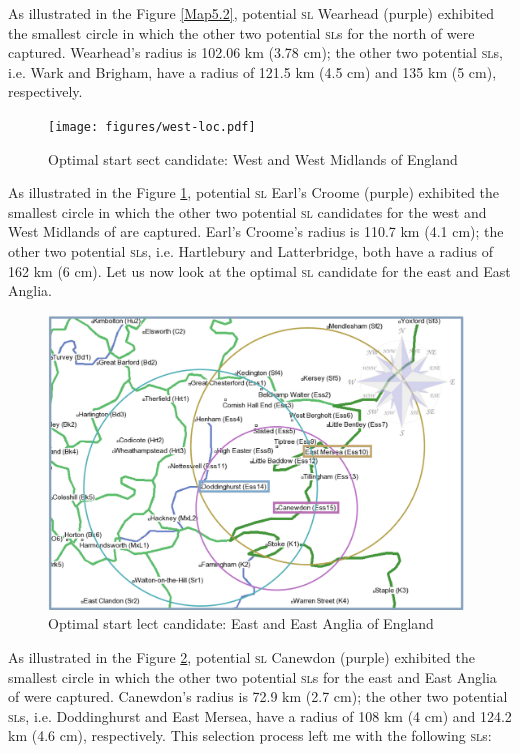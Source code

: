 As illustrated in the Figure \ref{Map5.2}, potential \textsc{sl} Wearhead (purple) exhibited the smallest circle in which the other two potential \textsc{sl}s for the north of  were captured. Wearhead's radius is 102.06 km (3.78 cm); the other two potential \textsc{sl}s, i.e. Wark and Brigham, have a radius of 121.5 km (4.5 cm) and 135 km (5 cm), respectively.
 

\begin{figure}
\texttt{[image: figures/west-loc.pdf]}
\caption {Optimal start sect candidate: West and West Midlands of England} 
\label{Map5.3}
\end{figure}

As illustrated in the Figure \ref{Map5.3}, potential \textsc{sl} Earl's Croome (purple) exhibited the smallest circle in which the other two potential \textsc{sl} candidates for the west and West Midlands of  are captured. Earl's Croome's radius is 110.7 km (4.1 cm); the other two potential \textsc{sl}s, i.e. Hartlebury and Latterbridge, both have a radius of 162 km (6 cm). Let us now look at the optimal \textsc{sl} candidate for the east and East Anglia.
 

\begin{figure}
\includegraphics[width=0.98\textwidth] {figures/east-loc.pdf}
\caption {Optimal start lect candidate: East and East Anglia of England} 
\label{Map5.4}
\end{figure}

As illustrated in the Figure \ref{Map5.4}, potential \textsc{sl} Canewdon (purple) exhibited the smallest circle in which the other two potential \textsc{sl}s for the east and East Anglia of  were captured. Canewdon's radius is 72.9 km (2.7 cm); the other two potential \textsc{sl}s, i.e. Doddinghurst and East Mersea, have a radius of 108 km (4 cm) and 124.2 km (4.6 cm), respectively. This selection process left me with the following \textsc{sl}s:

